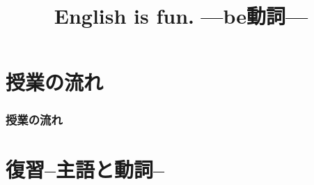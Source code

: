 \documentclass[aspectratio=169,xcolor={dvipsnames,table}]{beamer}
\title{English is fun.\,\,{}---be動詞---}
\author{}
\institute[]{}
\date[]
\newcommand{\myaudio}[1]{\href{#1}{\faVolumeUp}}
\begin{document}
%
%
%
%
\begin{frame}[label=title]
\thispagestyle{empty}
\titlepage
\end{frame}
%
%
%
%
%
%
%
\section*{授業の流れ}
\begin{frame}[plain]
  \frametitle{授業の流れ}
  \tableofcontents
\end{frame}
\section{復習--主語と動詞--}
\end{document}
